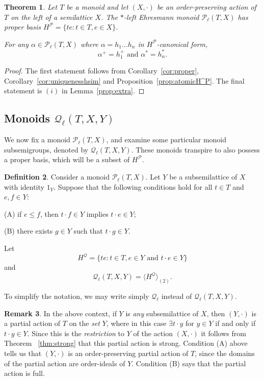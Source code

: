 \documentclass[12pt]{amsart}
\newtheorem{them}{Theorem}[section]
\theoremstyle{definition}
\newtheorem{rem}[them]{Remark}
\newtheorem{defn}[them]{Definition}
\theoremstyle{definition}
\numberwithin{them}{section}
\numberwithin{equation}{section}
\newcommand{\QQ}{\mbox{$\mathcal{Q}_\ell$}}
\begin{document}
{{ 
\begin{them}\label{them:newform} 
Let $T$ be a monoid  and let $(X,\cdot)$ be an order-preserving action of $T$ on the left of a semilattice $X$. The $*$-left Ehresmann monoid $\mathcal{P}_{\ell}(T,X)$ has proper basis  $H^{\mathcal{P}}=\{ te:t\in T, e\in X\}$. 

For  any $\alpha\in \mathcal{P}_{\ell}(T,X)$ where $\alpha= h_1\dots h_n$ in $H^{\mathcal{P}}$-canonical form, 
\[\alpha^+=h_1^+\mbox{ and }\alpha^*=h_n^*.\]
\end{them}
\begin{proof}The first statement follows from Corollary~\ref {cor:proper}, Corollary~\ref{cor:uniquenesshsim} and Proposition~\ref{prop:atomicH^P}. The final statement 
is $(i)$ in Lemma~\ref{prop:extra}.
\end{proof}


\subsection{Monoids $\QQ(T, X, Y)$ } \label{subsec:Q}


 We now fix a  monoid $\mathcal{P}_{\ell}(T,X)$, and 
examine  some particular monoid subsemigroups, denoted by  $\QQ(T, X, Y)$. These monoids  transpire to also possess a proper  basis, which will be a subset of $H^{\mathcal{P}}$. 



\begin{defn} Consider a monoid $\mathcal{P}_{\ell}(T,X)$.   Let  $Y$ be a subsemilattice of $X$ with identity $1_Y$.  Suppose that
the following conditions hold for all $t\in T$ and $e,f\in Y$:

(A) if  $e \leq f$, then $t \cdot f \in Y$ implies $t \cdot e \in Y$;

(B) there exists $g \in Y$ such that $t \cdot g \in Y$.

Let 
\[H^{\mathcal{Q}}=\{ te:t\in T, e\in Y\mbox{ and }t\cdot e\in Y\}\]
and \[\QQ(T, X, Y)=\langle H^{\mathcal{Q}}\rangle_{(2)}. \]
\end{defn}


To simplify the notation, we may write simply $\QQ$ instead of $\QQ(T, X, Y)$.


 
\begin{rem}\label{rem:restriction} In the above context, 
if  $Y$ is {\em any} subsemilattice of $X$, 
then $(Y,\cdot)$ is a partial action of $T$ on the {\em set} $Y$, where in this case $\exists t\cdot y$ for $y\in Y$ if and only if $t\cdot y\in Y$. Since this is the {\em restriction} to $Y$ of the action $(X,\cdot)$ it follows from Theorem ~\ref{thm:strong} that this 
 partial 
action is strong. Condition (A) above tells us that $(Y,\cdot)$ is an order-preserving partial action of $T$, since the domains of the 
partial
action are order-ideals of $Y$.  Condition (B) says that the partial action is full.



\end{rem}}}
\end{document}
